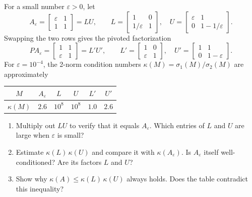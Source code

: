 \documentclass{ximera}
\begin{document}
\begin{exercise}

For a small number $\varepsilon > 0$, let
\[
A_\varepsilon = \begin{bmatrix} \varepsilon & 1 \\ 1 & 1 \end{bmatrix}
= LU,
\qquad
L = \begin{bmatrix} 1 & 0 \\ 1/\varepsilon & 1 \end{bmatrix},
\quad
U = \begin{bmatrix} \varepsilon & 1 \\ 0 & 1 - 1/\varepsilon \end{bmatrix}.
\]
Swapping the two rows gives the pivoted factorization
\[
PA_\varepsilon = \begin{bmatrix} 1 & 1 \\ \varepsilon & 1 \end{bmatrix}
= L'U',
\qquad
L' = \begin{bmatrix} 1 & 0 \\ \varepsilon & 1 \end{bmatrix},
\quad
U' = \begin{bmatrix} 1 & 1 \\ 0 & 1 - \varepsilon \end{bmatrix}.
\]
For $\varepsilon = 10^{-4}$, the 2-norm condition numbers
$\kappa(M) = \sigma_1(M)/\sigma_2(M)$ are approximately
\begin{center}
\begin{tabular}{c|ccccc}
$M$ & $A_\varepsilon$ & $L$ & $U$ & $L'$ & $U'$ \\ \hline
$\kappa(M)$ & $2.6$ & $10^{8}$ & $10^{8}$ & $1.0$ & $2.6$
\end{tabular}
\end{center}

\begin{enumerate}

\item Multiply out $LU$ to verify that it equals $A_\varepsilon$.
Which entries of $L$ and $U$ are large when $\varepsilon$ is small?
\vfill


\item Estimate $\kappa(L)\,\kappa(U)$ and compare it with $\kappa(A_\varepsilon)$. Is $A_\varepsilon$ itself well-conditioned? Are its factors $L$ and $U$?
\vfill

\item Show why $\kappa(A) \le \kappa(L)\,\kappa(U)$ always holds. Does the table contradict this inequality?
\vfill


\end{enumerate}
\end{exercise}
\end{document}
